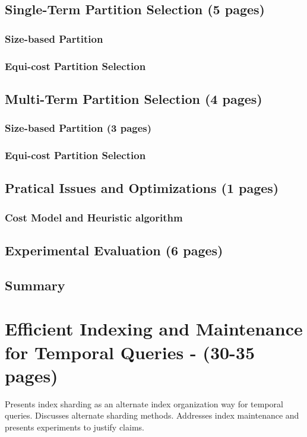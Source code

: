\documentclass[12pt]{article}
\begin{document}
	\subsection{Single-Term Partition Selection (5 pages)}
		\subsubsection{Size-based Partition}
		\subsubsection{Equi-cost Partition Selection}

	\subsection{Multi-Term Partition Selection (4 pages)}
		\subsubsection{Size-based Partition (3 pages)}
		\subsubsection{Equi-cost Partition Selection}


	\subsection{Pratical Issues and Optimizations (1 pages)}
		\subsubsection{Cost Model and Heuristic algorithm }

	\subsection{Experimental Evaluation (6 pages)}

	\subsection{Summary}


\newpage
\section{Efficient Indexing and Maintenance for Temporal Queries - (30-35 pages)}
	Presents index sharding as an alternate index organization way for temporal queries. Discusses alternate sharding methods. Addresses index maintenance and presents experiments to justify claims.
\end{document}
